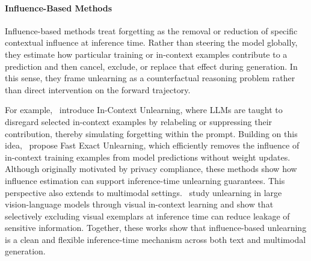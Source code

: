 \paragraph{Influence-Based Methods}

Influence-based methods treat forgetting as the removal or reduction of specific contextual influence at inference time. Rather than steering the model globally, they estimate how particular training or in-context examples contribute to a prediction and then cancel, exclude, or replace that effect during generation. In this sense, they frame unlearning as a counterfactual reasoning problem rather than direct intervention on the forward trajectory.

For example,~\citet{pawelczyk2023context} introduce In-Context Unlearning, where LLMs are taught to disregard selected in-context examples by relabeling or suppressing their contribution, thereby simulating forgetting within the prompt. Building on this idea,~\citet{muresanufast} propose Fast Exact Unlearning, which efficiently removes the influence of in-context training examples from model predictions without weight updates. Although originally motivated by privacy compliance, these methods show how influence estimation can support inference-time unlearning guarantees. This perspective also extends to multimodal settings.~\citet{zhou2024visual} study unlearning in large vision-language models through visual in-context learning and show that selectively excluding visual exemplars at inference time can reduce leakage of sensitive information. Together, these works show that influence-based unlearning is a clean and flexible inference-time mechanism across both text and multimodal generation.


